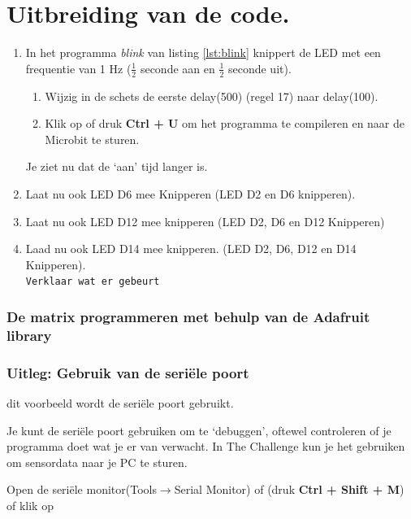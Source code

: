 \section{Uitbreiding van de code.}

\begin{enumerate}
	
\item In het programma \textit{blink} van listing \ref{lst:blink} knippert de LED met een frequentie van 1 Hz ($\frac{1}{2}$ seconde aan en $\frac{1}{2}$ seconde uit).\\
\begin{enumerate}
	\item Wijzig in de schets de eerste \textcolor{BurntOrange}{delay}(500) (regel 17) naar \textcolor{BurntOrange}{delay}(100).
	\item   Klik op  of druk \colorbox{mygray}{\textbf{Ctrl + U}} om het programma te compileren en naar de Microbit te sturen.
\end{enumerate}

Je ziet nu dat de ‘aan’ tijd langer is.
\item Laat nu ook LED D6 mee Knipperen (LED D2 en D6 knipperen).
\item Laat nu ook LED D12 mee knipperen (LED D2, D6 en D12 Knipperen)
\item Laad nu ook LED D14 mee knipperen. (LED D2, D6, D12 en D14 Knipperen).\\ \texttt{Verklaar wat er gebeurt}

\end{enumerate}

\subsubsection{De matrix programmeren met behulp van de Adafruit library}



\subsubsection{Uitleg: Gebruik van de seriële poort}

 dit voorbeeld wordt de seriële poort gebruikt.

Je kunt de seriële poort gebruiken om te ‘debuggen’, oftewel controleren of je programma doet wat je er van verwacht. In The Challenge kun je het gebruiken om sensordata naar je PC te sturen.

Open de seriële monitor(Tools$\rightarrow$Serial Monitor) of (druk \colorbox{mygray}{\textbf{Ctrl + Shift + M}}) of klik op 


